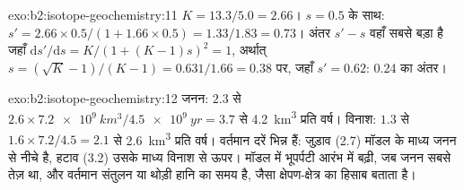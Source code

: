 \begin{solution}{exo:b2:isotope-geochemistry:11}
$K = 13.3/5.0 = 2.66$। $s = 0.5$ के साथ: $s' = 2.66\times0.5/(1 + 1.66\times0.5) =
1.33/1.83 = 0.73$। अंतर $s' - s$ वहाँ सबसे बड़ा है जहाँ
$\mathrm{d}s'/\mathrm{d}s = K/(1+(K-1)s)^2 = 1$, अर्थात् $s = (\sqrt K - 1)/(K-1) =
0.631/1.66 = 0.38$ पर, जहाँ $s' = 0.62$: 0.24 का अंतर।
\end{solution}

\begin{solution}{exo:b2:isotope-geochemistry:12}
जनन: $2.3$ से $2.6\times\qty{7.2e9}{km^3}/\qty{4.5e9}{yr} = 3.7$ से
\qty{4.2}{km^3} प्रति वर्ष। विनाश: $1.3$ से $1.6\times7.2/4.5 = 2.1$ से
\qty{2.6}{km^3} प्रति वर्ष। वर्तमान दरें भिन्न हैं: जुड़ाव (2.7) मॉडल के
माध्य जनन से नीचे है, हटाव (3.2) उसके माध्य विनाश से ऊपर। मॉडल में भूपर्पटी
आरंभ में बढ़ी, जब जनन सबसे तेज़ था, और वर्तमान संतुलन या थोड़ी
हानि का समय है, जैसा क्षेपण-क्षेत्र का हिसाब बताता है।
\end{solution}

